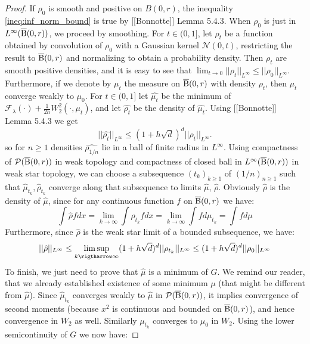 \begin{proof}
If $\rho_0$ is smooth and positive on $B(0,r)$, the inequality \ref{ineq:inf_norm_bound} is true by [[Bonnotte]] Lemma 5.4.3. When $\rho_0$ is just in $L^{\infty}(\operatorname{\overline{B}}(0,r))$, we proceed by smoothing. 
For $t \in (0,1]$, let $\rho_t$ be a function obtained by convolution of $\rho_0$ with a Gaussian kernel $\mathcal{N}(0, t)$, restricting the result to $\operatorname{\overline{B}}(0,r)$ and normalizing to obtain a probability density. Then $\rho_t$ are smooth positive densities, and it is easy to see that $\lim_{t \rightarrow 0} ||\rho_t||_{L^{\infty}} \leq ||\rho_0||_{L^{\infty}}$. Furthermore, if we denote by $\mu_t$ the measure on $\operatorname{\overline{B}}(0,r)$ with density $\rho_t$, then $\mu_t$ converge weakly to $\mu_0$.
For $t \in (0, 1]$ let $\hat{\mu_t}$ be the minimum of $ \mathcal{F}_{\lambda}(\cdot) + \frac{1}{2h} W_2^2(\cdot, \mu_t)$, and let $\hat{\rho_t}$ be the density of $\hat{\mu_t}$. Using [[Bonnotte]] Lemma 5.4.3 we get 
\[
||\hat{\rho_t} ||_{L^{\infty}} \leq (1 + h\sqrt{d})^d ||\rho_t||_{L^{\infty}}.
\]
so for $n \geq 1$ densities $\hat{\rho_{1/n}}$ lie in a ball of finite radius in $L^{\infty}$.  Using compactness of $\mathcal{P}(\operatorname{\overline{B}}(0,r))$ in weak topology and compactness of closed ball in $L^{\infty}(\operatorname{\overline{B}}(0,r))$ in weak star topology, we can choose a subsequence $(t_k)_{k \geq 1}$  of $(1/n)_{n \geq 1}$ such that $\hat{\mu}_{t_k} , \hat{\rho}_{t_k}$ converge along that subsequence to limits $\hat{\mu}$, $\hat{\rho}$. Obviously $\hat{\rho}$ is the density of $\hat{\mu}$, since for any continuous function $f$  on $\operatorname{\overline{B}}(0,r)$ we have:
\[
\int \hat{\rho} f dx = \lim_{k \rightarrow \infty} \int \rho_{t_k} f dx = \lim_{k \rightarrow \infty} \int f d\mu_{t_k} = \int f d\mu
\]
Furthermore, since $\hat{\rho}$ is the weak star limit of a bounded subsequence, we have:
\[
||\hat{\rho} ||_{L^{\infty}} \leq \limsup_{k \rigtharrow \infty}(1 + h\sqrt{d})^d ||\rho_{t_k}||_{L^{\infty}} \leq (1 + h\sqrt{d})^d ||\rho_0||_{L^{\infty}}
\]
To finish, we just need to prove that $\hat{\mu}$ is a minimum of $G$. We remind our reader, that we already established existence of some minimum $\mu$ (that might be different from $\hat{\mu}$). Since $\hat{\mu}_{t_k}$ converges weakly to $\hat{\mu}$ in $\mathcal{P}(\operatorname{\overline{B}}(0,r))$, it implies convergence of second moments (because $x^2$ is continuous and bounded on $\operatorname{\overline{B}}(0,r)$), and hence convergence in $W_2$ as well. Similarly $\mu_{t_k}$ converges to $\mu_0$ in $W_2$. Using the lower semicontinuity of $G$ we now have:

\end{proof}

